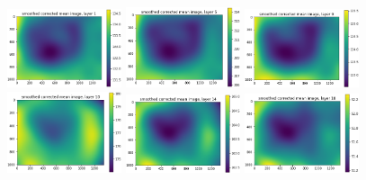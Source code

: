 \documentclass[letterpaper,11pt]{article}
\begin{document}
\begin{figure}[!ht]
\centering
\includegraphics[width=0.3\textwidth]{images/results/unmasked_smoothed_corrected_mean_image_layers/unmasked_smoothed_corrected_mean_image_layer_1}
\includegraphics[width=0.3\textwidth]{images/results/unmasked_smoothed_corrected_mean_image_layers/unmasked_smoothed_corrected_mean_image_layer_5}
\includegraphics[width=0.3\textwidth]{images/results/unmasked_smoothed_corrected_mean_image_layers/unmasked_smoothed_corrected_mean_image_layer_9}
\includegraphics[width=0.3\textwidth]{images/results/unmasked_smoothed_corrected_mean_image_layers/unmasked_smoothed_corrected_mean_image_layer_10}
\includegraphics[width=0.3\textwidth]{images/results/unmasked_smoothed_corrected_mean_image_layers/unmasked_smoothed_corrected_mean_image_layer_14}
\includegraphics[width=0.3\textwidth]{images/results/unmasked_smoothed_corrected_mean_image_layers/unmasked_smoothed_corrected_mean_image_layer_18}

\end{figure}
\end{document}

